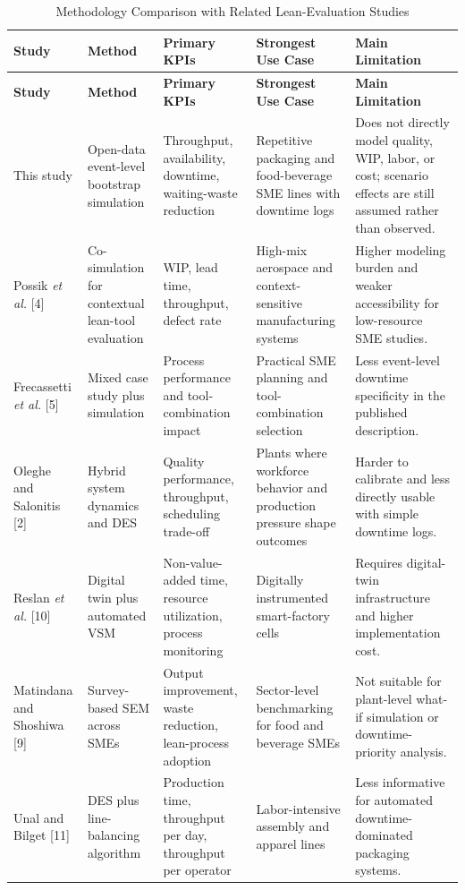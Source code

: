 \documentclass[12pt,a4paper]{article}
\begin{document}
\begin{longtable}{p{2.15cm}p{2.6cm}p{2.45cm}p{3.15cm}p{3.35cm}}
\caption{Methodology Comparison with Related Lean-Evaluation Studies}\\
\toprule
\textbf{Study} & \textbf{Method} & \textbf{Primary KPIs} & \textbf{Strongest Use Case} & \textbf{Main Limitation} \\
\midrule
\endfirsthead
\toprule
\textbf{Study} & \textbf{Method} & \textbf{Primary KPIs} & \textbf{Strongest Use Case} & \textbf{Main Limitation} \\
\midrule
\endhead
This study & Open-data event-level bootstrap simulation & Throughput, availability, downtime, waiting-waste reduction & Repetitive packaging and food-beverage SME lines with downtime logs & Does not directly model quality, WIP, labor, or cost; scenario effects are still assumed rather than observed. \\
Possik \emph{et al.} [4] & Co-simulation for contextual lean-tool evaluation & WIP, lead time, throughput, defect rate & High-mix aerospace and context-sensitive manufacturing systems & Higher modeling burden and weaker accessibility for low-resource SME studies. \\
Frecassetti \emph{et al.} [5] & Mixed case study plus simulation & Process performance and tool-combination impact & Practical SME planning and tool-combination selection & Less event-level downtime specificity in the published description. \\
Oleghe and Salonitis [2] & Hybrid system dynamics and DES & Quality performance, throughput, scheduling trade-off & Plants where workforce behavior and production pressure shape outcomes & Harder to calibrate and less directly usable with simple downtime logs. \\
Reslan \emph{et al.} [10] & Digital twin plus automated VSM & Non-value-added time, resource utilization, process monitoring & Digitally instrumented smart-factory cells & Requires digital-twin infrastructure and higher implementation cost. \\
Matindana and Shoshiwa [9] & Survey-based SEM across SMEs & Output improvement, waste reduction, lean-process adoption & Sector-level benchmarking for food and beverage SMEs & Not suitable for plant-level what-if simulation or downtime-priority analysis. \\
Unal and Bilget [11] & DES plus line-balancing algorithm & Production time, throughput per day, throughput per operator & Labor-intensive assembly and apparel lines & Less informative for automated downtime-dominated packaging systems. \\
\bottomrule
\end{longtable}
\end{document}
